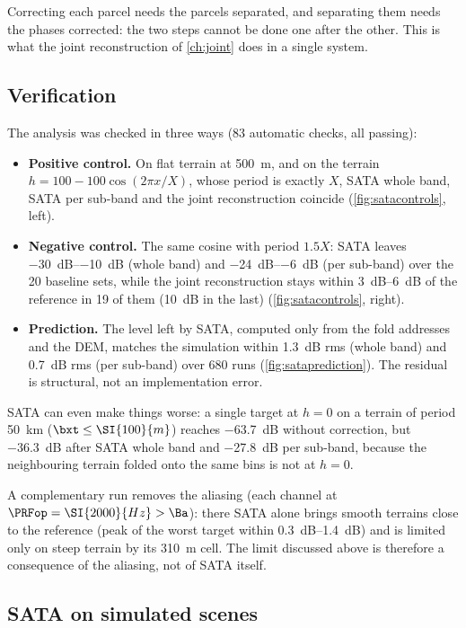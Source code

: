Correcting each parcel needs the parcels separated, and separating them needs the phases corrected: the two steps cannot be
done one after the other. This is what the joint reconstruction of \cref{ch:joint} does in a single system.

\subsection{Verification}

The analysis was checked in three ways (83 automatic checks, all passing):
\begin{itemize}
  \item \textbf{Positive control.} On flat terrain at \SI{500}{m}, and on the terrain $h=100-100\cos(2\pi x/X)$, whose period is
        exactly $X$, SATA whole band, SATA per sub-band and the joint reconstruction coincide (\cref{fig:satacontrols}, left).
  \item \textbf{Negative control.} The same cosine with period $1.5X$: SATA leaves \SIrange{-30}{-10}{dB} (whole band) and
        \SIrange{-24}{-6}{dB} (per sub-band) over the 20 baseline sets, while the joint reconstruction stays within
        \SIrange{3}{6}{dB} of the reference in 19 of them (\SI{10}{dB} in the last) (\cref{fig:satacontrols}, right).
  \item \textbf{Prediction.} The level left by SATA, computed only from the fold addresses and the DEM, matches the
        simulation within \SI{1.3}{dB} rms (whole band) and \SI{0.7}{dB} rms (per sub-band) over 680 runs
        (\cref{fig:sataprediction}). The residual is
        structural, not an implementation error.
\end{itemize}
SATA can even make things worse: a single target at $h=0$ on a terrain of period \SI{50}{km} ($\bxt\le\SI{100}{m}$)
reaches \SI{-63.7}{dB} without correction, but \SI{-36.3}{dB} after SATA whole band and \SI{-27.8}{dB} per sub-band,
because the neighbouring terrain folded onto the same bins is not at $h=0$.

A complementary run removes the aliasing (each channel at $\PRFop=\SI{2000}{Hz}>\Ba$): there SATA alone brings smooth
terrains close to the reference (peak of the worst target within \SIrange{0.3}{1.4}{dB}) and is limited only on steep
terrain by its \SI{310}{m} cell. The limit discussed above is therefore a consequence of the aliasing, not of SATA itself.

\subsection{SATA on simulated scenes}\label{sec:sata-examples}

